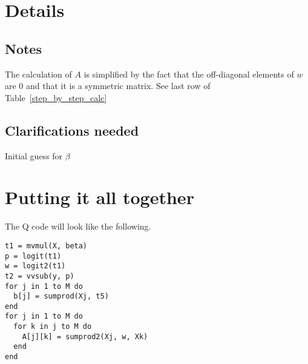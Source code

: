 \documentclass[12pt,timesnewroman,letterpaper]{article}
\begin{document}
\section{Details}

\subsection{Notes}

\be
\item The calculation of \(A\) is simplified by the fact that the off-diagonal
  elements of \(w\) are 0 and that it is a symmetric matrix. See last row of
  Table~\ref{step_by_step_calc}
\ee
\subsection{Clarifications needed}

\be
\item Initial guess for \(\beta\)
\ee

\section{Putting it all together}
The Q code will look like the following.

\begin{verbatim}
t1 = mvmul(X, beta)  
p = logit(t1)
w = logit2(t1)
t2 = vvsub(y, p)
for j in 1 to M do 
  b[j] = sumprod(Xj, t5) 
end
for j in 1 to M do 
  for k in j to M do 
    A[j][k] = sumprod2(Xj, w, Xk)
  end
end
\end{verbatim}
\end{document}
